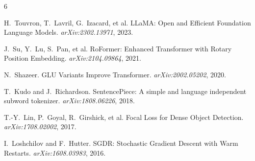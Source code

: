 \documentclass[10pt,a4paper]{ctexart}
\begin{document}
\begin{thebibliography}{6}
\small

H.~Touvron, T.~Lavril, G.~Izacard, et al.
\newblock LLaMA: Open and Efficient Foundation Language Models.
\newblock \emph{arXiv:2302.13971}, 2023.

J.~Su, Y.~Lu, S.~Pan, et al.
\newblock RoFormer: Enhanced Transformer with Rotary Position Embedding.
\newblock \emph{arXiv:2104.09864}, 2021.

N.~Shazeer.
\newblock GLU Variants Improve Transformer.
\newblock \emph{arXiv:2002.05202}, 2020.

T.~Kudo and J.~Richardson.
\newblock SentencePiece: A simple and language independent subword tokenizer.
\newblock \emph{arXiv:1808.06226}, 2018.

T.-Y.~Lin, P.~Goyal, R.~Girshick, et al.
\newblock Focal Loss for Dense Object Detection.
\newblock \emph{arXiv:1708.02002}, 2017.

I.~Loshchilov and F.~Hutter.
\newblock SGDR: Stochastic Gradient Descent with Warm Restarts.
\newblock \emph{arXiv:1608.03983}, 2016.

\end{thebibliography}
\end{document}
